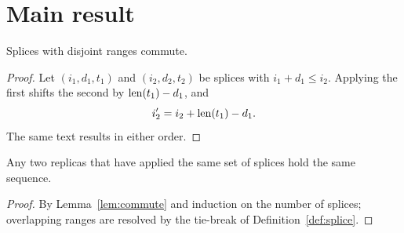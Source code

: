 \section{Main result}\label{sec:main}

\begin{lemma}\label{lem:commute}
Splices with disjoint ranges commute.
\end{lemma}

\begin{proof}
Let $(i_1, d_1, t_1)$ and $(i_2, d_2, t_2)$ be splices with $i_1 + d_1 \le i_2$.
Applying the first shifts the second by $\operatorname{len}(t_1) - d_1$, and
\[
  i_2' = i_2 + \operatorname{len}(t_1) - d_1 .
\]
The same text results in either order.
\end{proof}

\begin{theorem}[Convergence]\label{thm:main}
Any two replicas that have applied the same set of splices hold the same sequence.
\end{theorem}

\begin{proof}
By Lemma~\ref{lem:commute} and induction on the number of splices; overlapping
ranges are resolved by the tie-break of Definition~\ref{def:splice}.
\end{proof}

